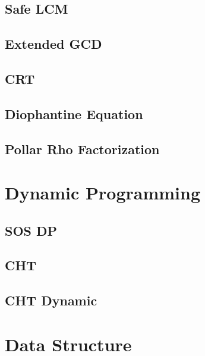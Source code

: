\section{Safe LCM}


\section{Extended GCD}


\section{CRT}


\section{Diophantine Equation}


\section{Pollar Rho Factorization}


\chapter{Dynamic Programming}
\section{SOS DP}


\section{CHT}


\section{CHT Dynamic}


\chapter{Data Structure}
